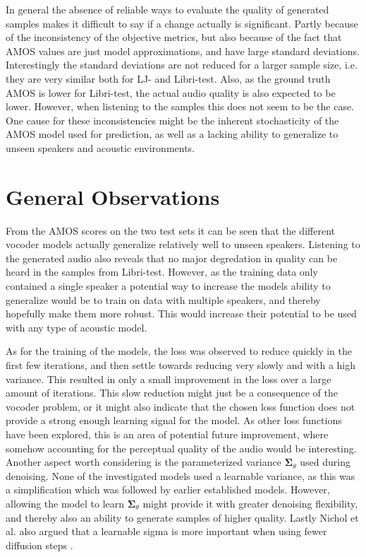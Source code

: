 \documentclass{report}
\begin{document}
In general the absence of reliable ways to evaluate the quality of generated samples makes it difficult to say if a change actually is significant. Partly because of the inconsistency of the objective metrics, but also because of the fact that AMOS values are just model approximations, and have large standard deviations. Interestingly the standard deviations are not reduced for a larger sample size, i.e. they are very similar both for LJ- and Libri-test. Also, as the ground truth AMOS is lower for Libri-test, the actual audio quality is also expected to be lower. However, when listening to the samples this does not seem to be the case. One cause for these inconsistencies might be the inherent stochasticity of the AMOS model used for prediction, as well as a lacking ability to generalize to unseen speakers and acoustic environments.

\section{General Observations} \label{sec:genobs}

From the AMOS scores on the two test sets it can be seen that the different vocoder models actually generalize relatively well to unseen speakers. Listening to the generated audio also reveals that no major degredation in quality can be heard in the samples from Libri-test. However, as the training data only contained a single speaker a potential way to increase the models ability to generalize would be to train on data with multiple speakers, and thereby hopefully make them more robust. This would increase their potential to be used with any type of acoustic model.

As for the training of the models, the loss was observed to reduce quickly in the first few iterations, and then settle towards reducing very slowly and with a high variance. This resulted in only a small improvement in the loss over a large amount of iterations. This slow reduction might just be a consequence of the vocoder problem, or it might also indicate that the chosen loss function does not provide a strong enough learning signal for the model. As other loss functions have been explored, this is an area of potential future improvement, where somehow accounting for the perceptual quality of the audio would be interesting. Another aspect worth considering is the parameterized variance $\bm{\Sigma}_{\theta}$ used during denoising. None of the investigated models used a learnable variance, as this was a simplification which was followed by earlier established models. However, allowing the model to learn $\bm{\Sigma}_{\theta}$ might provide it with greater denoising flexibility, and thereby also an ability to generate samples of higher quality. Lastly Nichol et al. also argued that a learnable sigma is more important when using fewer diffusion steps \cite{nichol2021improved}.
\end{document}
